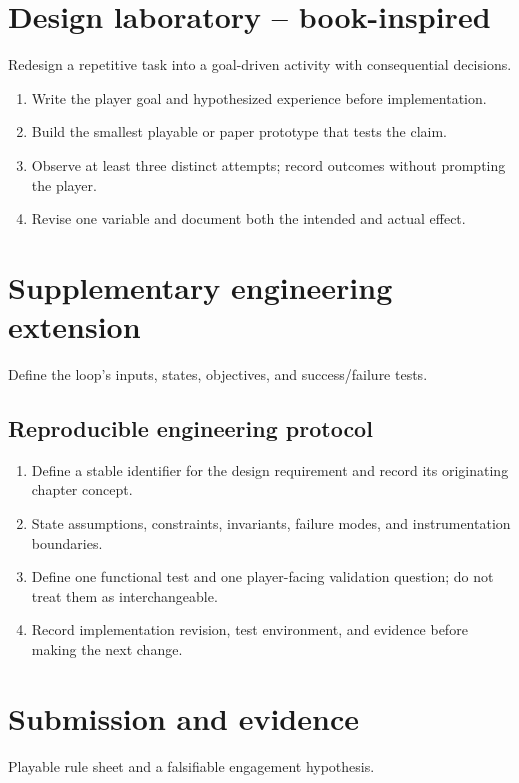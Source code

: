 \documentclass[11pt]{article}
\begin{document}
\section{Design laboratory -- book-inspired}
Redesign a repetitive task into a goal-driven activity with consequential decisions.

\begin{enumerate}
\item Write the player goal and hypothesized experience before implementation.
\item Build the smallest playable or paper prototype that tests the claim.
\item Observe at least three distinct attempts; record outcomes without prompting the player.
\item Revise one variable and document both the intended and actual effect.
\end{enumerate}

\section{Supplementary engineering extension}
Define the loop's inputs, states, objectives, and success/failure tests.


\subsection{Reproducible engineering protocol}
\begin{enumerate}
\item Define a stable identifier for the design requirement and record its originating chapter concept.
\item State assumptions, constraints, invariants, failure modes, and instrumentation boundaries.
\item Define one functional test and one player-facing validation question; do not treat them as interchangeable.
\item Record implementation revision, test environment, and evidence before making the next change.
\end{enumerate}

\section{Submission and evidence}
Playable rule sheet and a falsifiable engagement hypothesis.
\end{document}
